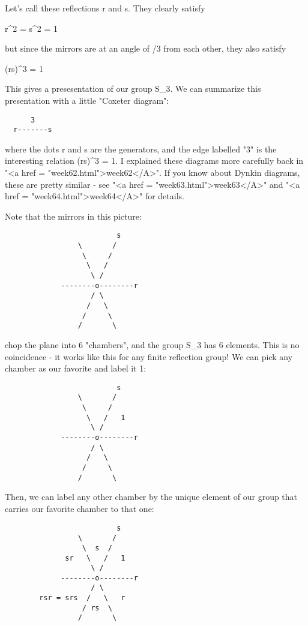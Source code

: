 Let's call these reflections r and s.  They clearly satisfy

r^{2} = s^{2} = 1

but since the mirrors are at an angle of \pi /3 from each other,
they also satisfy

(rs)^{3} = 1

This gives a presesentation of our group S_{3}.  We can summarize 
this presentation with a little "Coxeter diagram":
       
\begin{verbatim}
      3
  r-------s
\end{verbatim}
    

where the dots r and s are the generators, and the edge labelled
"3" is the interesting relation (rs)^{3} = 1.  I
explained these diagrams more carefully back in "<a href =
"week62.html">week62</A>".  If you know about Dynkin diagrams,
these are pretty similar - see "<a href =
"week63.html">week63</A>" and "<a href =
"week64.html">week64</A>" for details.

Note that the mirrors in this picture:

\begin{verbatim}
                          s 
                 \       /
                  \     /
                   \   /
                    \ /
             --------o--------r
                    / \
                   /   \
                  /     \
                 /       \
\end{verbatim}
    
chop the plane into 
6 "chambers", and the group S_{3} has 6
elements.  This is no coincidence - it works like this for any finite
reflection group!  We can pick any chamber as our favorite and label
it 1:

\begin{verbatim}
                          s 
                 \       /
                  \     /  
                   \   /   1
                    \ /
             --------o--------r
                    / \
                   /   \
                  /     \
                 /       \
\end{verbatim}
    
Then, we can label any other chamber by the unique element of
our group that carries our favorite chamber to that one:

\begin{verbatim}
                          s 
                 \       /
                  \  s  /     
              sr   \   /   1
                    \ /
             --------o--------r
                    / \
        rsr = srs  /   \   r
                  / rs  \  
                 /       \
\end{verbatim}
    
